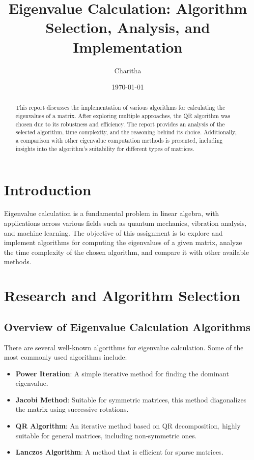 \documentclass[12pt]{article}
\title{Eigenvalue Calculation: Algorithm Selection, Analysis, and Implementation}
\author{Charitha}
\date{\today}
\begin{document}
\maketitle

\begin{abstract}
This report discusses the implementation of various algorithms for calculating the eigenvalues of a matrix. After exploring multiple approaches, the QR algorithm was chosen due to its robustness and efficiency. The report provides an analysis of the selected algorithm, time complexity, and the reasoning behind its choice. Additionally, a comparison with other eigenvalue computation methods is presented, including insights into the algorithm's suitability for different types of matrices.
\end{abstract}

\section{Introduction}
Eigenvalue calculation is a fundamental problem in linear algebra, with applications across various fields such as quantum mechanics, vibration analysis, and machine learning. The objective of this assignment is to explore and implement algorithms for computing the eigenvalues of a given matrix, analyze the time complexity of the chosen algorithm, and compare it with other available methods.

\section{Research and Algorithm Selection}

\subsection{Overview of Eigenvalue Calculation Algorithms}
There are several well-known algorithms for eigenvalue calculation. Some of the most commonly used algorithms include:

\begin{itemize}
    \item \textbf{Power Iteration}: A simple iterative method for finding the dominant eigenvalue.
    \item \textbf{Jacobi Method}: Suitable for symmetric matrices, this method diagonalizes the matrix using successive rotations.
    \item \textbf{QR Algorithm}: An iterative method based on QR decomposition, highly suitable for general matrices, including non-symmetric ones.
    \item \textbf{Lanczos Algorithm}: A method that is efficient for sparse matrices.
\end{itemize}
\end{document}
